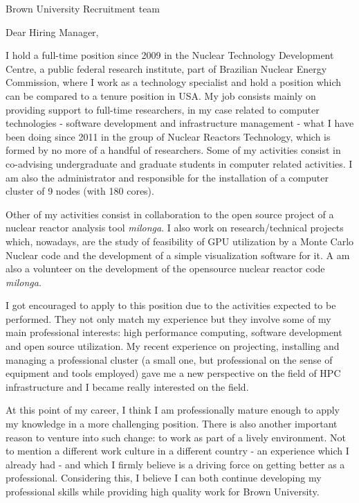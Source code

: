 \documentclass[11pt]{letter}
\begin{document}
\begin{letter}{Brown University Recruitment team}

  \opening{Dear Hiring Manager,}
  
  I hold a full-time position since 2009 in the Nuclear Technology Development Centre, a public federal
  research institute, part of Brazilian Nuclear Energy Commission, where I work as a technology
  specialist and hold a position which can be compared to a tenure position in USA. My job consists mainly on
  providing support to full-time researchers, in my case
  related to computer technologies - software development and infrastructure management - what I have been
  doing since 2011 in the group of Nuclear Reactors Technology, which is formed by no more of a handful of researchers.
  Some of my activities consist in co-advising undergraduate and graduate students in computer related
  activities. I am also the administrator and responsible for the installation of a
  computer cluster of 9 nodes (with 180 cores).

  Other of my activities consist in collaboration
  to the open source project of a nuclear reactor
  analysis tool \textit{milonga}. I also work on research/technical projects which, nowadays, are the study of
  feasibility of GPU utilization by a Monte Carlo Nuclear code and the development of
  a simple visualization software for it. A am also a volunteer on the development of the opensource nuclear
  reactor code \textit{milonga}.
  
  I got encouraged to apply to this position due to the activities expected to be performed. They not only
  match my experience but they involve some of my main professional interests: high performance computing,
  software development and open source utilization. %
  My recent experience on projecting, installing and managing a professional
  cluster (a small one, but professional on the sense of equipment and tools employed) gave me a new perspective
  on the field of HPC infrastructure and I became really interested on the field.
  
  At this point of my career, I think I am professionally mature enough to apply my knowledge in a more
  challenging position. There is also another important reason to venture into such change: to work
  as part of a lively environment. Not to mention a different work culture in a different country - an
  experience which I already had - and which I firmly believe is a driving force on getting better as a professional.
  Considering this, I believe I can both continue developing my professional skills while providing high quality work
  for Brown University.
  

\end{letter}
\end{document}
